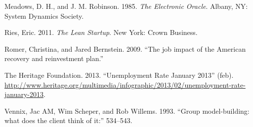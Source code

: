 \documentclass[]{memoir}
\begin{document}
Meadows, D. H., and J. M. Robinson. 1985. \emph{The Electronic Oracle}.
Albany, NY: System Dynamics Society.

Ries, Eric. 2011. \emph{The Lean Startup}. New York: Crown Business.

Romer, Christina, and Jared Bernstein. 2009. ``The job impact of the
American recovery and reinvestment plan.''

The Heritage Foundation. 2013. ``Unemployment Rate January 2013'' (feb).
\url{http://www.heritage.org/multimedia/infographic/2013/02/unemployment-rate-january-2013}.

Vennix, Jac AM, Wim Scheper, and Rob Willems. 1993. ``Group
model-building: what does the client think of it:'' 534--543.
\end{document}
